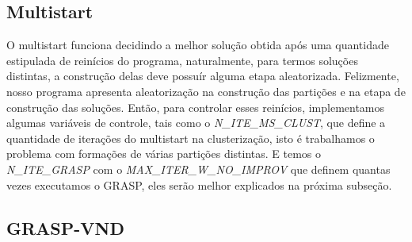 \documentclass[12pt, a4paper]{article}
\begin{document}
\subsection{Multistart}

O multistart funciona decidindo a melhor solução obtida após uma quantidade estipulada de reinícios do programa, naturalmente, para termos soluções distintas, a construção delas deve possuír alguma etapa aleatorizada. Felizmente, nosso programa apresenta aleatorização na construção das partições e na etapa de construção das soluções. Então, para controlar esses reinícios, implementamos algumas variáveis de controle, tais como o \textit{N\_ITE\_MS\_CLUST}, que define a quantidade de iterações do multistart na clusterização, isto é trabalhamos o problema com formações de várias partições distintas. E temos o \textit{N\_ITE\_GRASP} com o \textit{MAX\_ITER\_W\_NO\_IMPROV} que definem quantas vezes executamos o GRASP, eles serão melhor explicados na próxima subseção.


\subsection{GRASP-VND}
\end{document}
